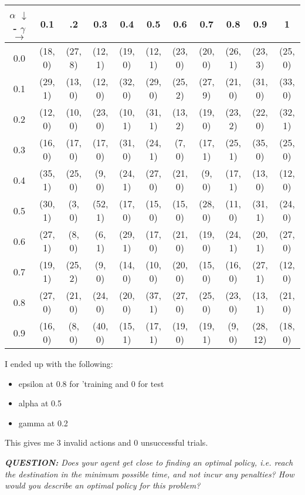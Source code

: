 \documentclass[11pt]{article}
\begin{document}
 \begin{center}
 \tabcolsep=0.05cm
 \begin{tabular}{ c || c | c | c | c | c | c | c | c | c | c }
 $\alpha$ $\downarrow$ - $\gamma$ $\rightarrow$ & 0.1&.2&0.3&0.4&0.5&0.6&0.7 & 0.8 & 0.9 & 1 \\
 \hline
 \hline
0.0 & (18, 0) & (27, 8) & (12, 1) & (19, 0) & (12, 1) & (23, 0) & (20, 0) & (26, 1) & (23, 3) & (25, 0)\\
0.1 & (29, 1) & (13, 0) & (12, 0) & (32, 0) & (29, 0) & (25, 2) & (27, 9) & (21, 0) & (31, 0) & (33, 0)\\
0.2 & (12, 0) & (10, 0) & (23, 0) & (10, 1) & (31, 1) & (13, 2) & (19, 0) & (23, 2) & (22, 0) & (32, 1)\\
0.3 & (16, 0) & (17, 0) & (17, 0) & (31, 0) & (24, 1) & (7, 0) & (17, 1) & (25, 1) & (35, 0) & (25, 0)\\
0.4 & (35, 1) & (25, 0) & (9, 0) & (24, 1) & (27, 0) & (21, 0) & (9, 0) & (17, 1) & (13, 0) & (12, 0)\\
0.5 & (30, 1) & (3, 0) & (52, 1) & (17, 0) & (15, 0) & (15, 0) & (28, 0) & (11, 0) & (31, 1) & (24, 0)\\
0.6 & (27, 1) & (8, 0) & (6, 1) & (29, 1) & (17, 0) & (21, 0) & (19, 0) & (24, 1) & (20, 1) & (27, 0)\\
0.7 & (19, 1) & (25, 2) & (9, 0) & (14, 0) & (10, 0) & (20, 0) & (15, 0) & (16, 0) & (27, 1) & (12, 0)\\
0.8 & (27, 0) & (21, 0) & (24, 0) & (20, 0) & (37, 1) & (27, 0) & (25, 0) & (23, 0) & (13, 1) & (21, 0)\\
0.9 & (16, 0) & (8, 0) & (40, 0) & (15, 1) & (17, 1) & (19, 0) & (19, 1) & (9, 0) & (28, 12) & (18, 0)
 \end{tabular}
 \end{center}
I ended up with the following:
\begin{itemize}
\item epsilon at 0.8 for 'training and 0 for test
\item alpha at 0.5
\item gamma at 0.2
\end{itemize}

This gives me 3 invalid actions and 0 unsuccessful trials. 

\begin{center}
\textit{\textbf{QUESTION:} Does your agent get close to finding an optimal policy, i.e. reach the destination in the minimum possible time, and not incur any penalties? How would you describe an optimal policy for this problem?}
\end{center}
\end{document}
